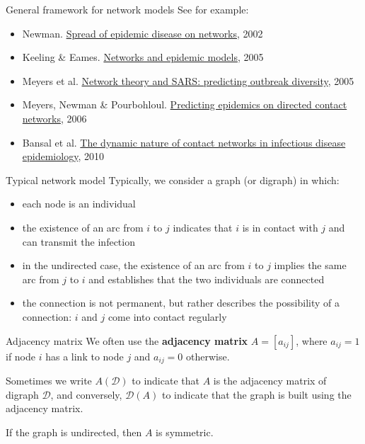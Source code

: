 \documentclass[aspectratio=169]{beamer}\usepackage[]{graphicx}\usepackage[]{xcolor}
\begin{document}
\begin{frame}{General framework for network models}
  See for example:
  \begin{itemize}
    \item Newman. \href{https://doi.org/10.1103/PhysRevE.66.016128}{Spread of epidemic disease on networks}, 2002
    \item Keeling \& Eames. \href{https://doi.org/10.1098/rsif.2005.0051}{Networks and epidemic models}, 2005
    \item Meyers et al. \href{https://doi.org/10.1016/j.jtbi.2004.07.026}{Network theory and SARS: predicting outbreak diversity}, 2005
    \item Meyers, Newman \& Pourbohloul. \href{https://doi.org/10.1016/j.jtbi.2005.10.004}{Predicting epidemics on directed contact networks}, 2006
    \item Bansal et al. \href{https://doi.org/10.1080/17513758.2010.503376}{The dynamic nature of contact networks in infectious disease epidemiology}, 2010
  \end{itemize}
\end{frame}

\begin{frame}{Typical network model}
  Typically, we consider a graph (or digraph) in which:
  \begin{itemize}
    \item each node is an individual
    \item the existence of an arc from $i$ to $j$ indicates that $i$ is in contact with $j$ and can transmit the infection
    \item in the undirected case, the existence of an arc from $i$ to $j$ implies the same arc from $j$ to $i$ and establishes that the two individuals are connected
    \item the connection is not permanent, but rather describes the possibility of a connection: $i$ and $j$ come into contact regularly
  \end{itemize}
\end{frame}

\begin{frame}{Adjacency matrix}
  We often use the \textbf{adjacency matrix} $A=[a_{ij}]$, where $a_{ij}=1$ if node $i$ has a link to node $j$ and $a_{ij}=0$ otherwise.
  
  Sometimes we write $A(\mathcal{D})$ to indicate that $A$ is the adjacency matrix of digraph $\mathcal{D}$, and conversely, $\mathcal{D}(A)$ to indicate that the graph is built using the adjacency matrix.
  
  If the graph is undirected, then $A$ is symmetric.
\end{frame}
\end{document}
